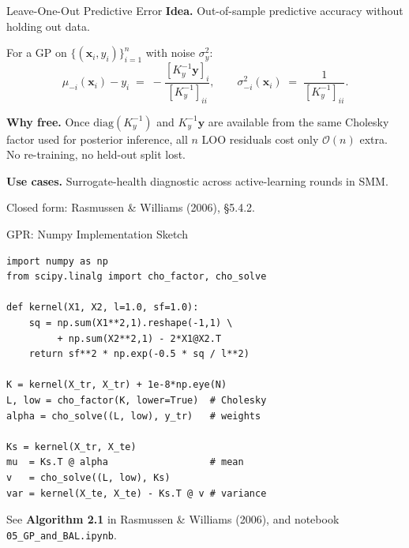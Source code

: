 \documentclass[aspectratio=169,11pt]{beamer}
\newcommand{\x}{\bm{x}}
\begin{document}
\begin{frame}{Leave-One-Out Predictive Error}
\textbf{Idea.} Out-of-sample predictive accuracy without holding out data.

\smallskip
For a GP on $\{(\x_i, y_i)\}_{i=1}^n$ with noise $\sigma_y^2$:
\begin{equation*}
\mu_{-i}(\x_i) - y_i \;=\; -\frac{[K_y^{-1}\bm y]_i}{[K_y^{-1}]_{ii}}, \qquad
\sigma_{-i}^2(\x_i) \;=\; \frac{1}{[K_y^{-1}]_{ii}}.
\end{equation*}

\smallskip
\textbf{Why free.} Once $\mathrm{diag}(K_y^{-1})$ and $K_y^{-1}\bm y$ are available from the same Cholesky factor used for posterior inference, all $n$ LOO residuals cost only $\mathcal O(n)$ extra. No re-training, no held-out split lost.

\smallskip
\textbf{Use cases.} Surrogate-health diagnostic across active-learning rounds in SMM.

\medskip
{\scriptsize Closed form: Rasmussen \& Williams (2006), \S5.4.2.}
\end{frame}

\begin{frame}[fragile]{GPR: Numpy Implementation Sketch}
\begin{lstlisting}[basicstyle=\footnotesize\ttfamily]
import numpy as np
from scipy.linalg import cho_factor, cho_solve

def kernel(X1, X2, l=1.0, sf=1.0):
    sq = np.sum(X1**2,1).reshape(-1,1) \
         + np.sum(X2**2,1) - 2*X1@X2.T
    return sf**2 * np.exp(-0.5 * sq / l**2)

K = kernel(X_tr, X_tr) + 1e-8*np.eye(N)
L, low = cho_factor(K, lower=True)  # Cholesky
alpha = cho_solve((L, low), y_tr)   # weights

Ks = kernel(X_tr, X_te)
mu  = Ks.T @ alpha                  # mean
v   = cho_solve((L, low), Ks)
var = kernel(X_te, X_te) - Ks.T @ v # variance
\end{lstlisting}

{\scriptsize See \textbf{Algorithm 2.1} in Rasmussen \& Williams (2006), and notebook \texttt{05\_GP\_and\_BAL.ipynb}.}
\end{frame}
\end{document}
